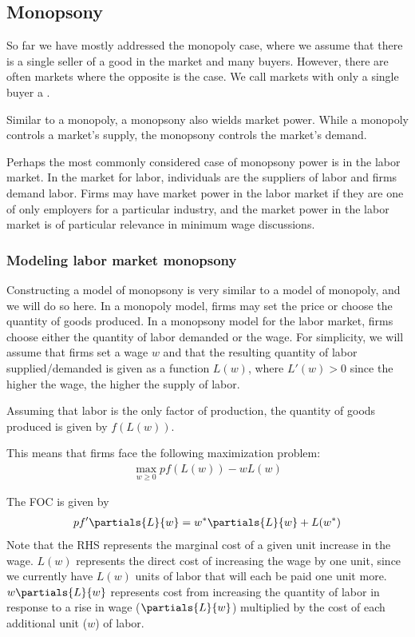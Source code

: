 \subsection*{Monopsony}
So far we have mostly addressed the monopoly case, where we assume that there is a single seller of a good in the market and many buyers. However, there are often markets where the opposite is the case. We call markets with only a single buyer a . 

Similar to a monopoly, a monopsony also wields market power. While a monopoly controls a market's supply, the monopsony controls the market's demand. 

Perhaps the most commonly considered case of monopsony power is in the labor market. In the market for labor, individuals are the suppliers of labor and firms demand labor. Firms may have market power in the labor market if they are one of only employers for a particular industry, and the market power in the labor market is of particular relevance in minimum wage discussions.

\subsubsection*{Modeling labor market monopsony}
Constructing a model of monopsony is very similar to a model of monopoly, and we will do so here. In a monopoly model, firms may set the price or choose the quantity of goods produced. In a monopsony model for the labor market, firms choose either the quantity of labor demanded or the wage. For simplicity, we will assume that firms set a wage $w$ and that the resulting quantity of labor supplied/demanded is given as a function $L(w)$, where $L'(w) > 0$ since the higher the wage, the higher the supply of labor. 

Assuming that labor is the only factor of production, the quantity of goods produced is given by $f(L(w))$.

This means that firms face the following maximization problem:
\begin{align*}
    \max_{w \geq 0} pf(L(w)) - w L(w)
\end{align*}

The FOC is given by
\begin{align*}
    p f' \partials{L}{w} = w^* \partials{L}{w} +  L(w^*)
\end{align*}
Note that the RHS represents the marginal cost of a given unit increase in the wage. $L(w)$ represents the direct cost of increasing the wage by one unit, since we currently have $L(w)$ units of labor that will each be paid one unit more. $w \partials{L}{w}$ represents cost from increasing the quantity of labor in response to a rise in wage ($\partials{L}{w}$) multiplied by the cost of each additional unit ($w$) of labor. 

